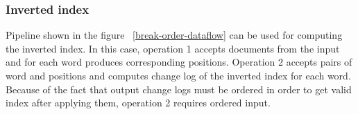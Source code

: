 \subsubsection{Inverted index}

Pipeline shown in the figure ~\ref{break-order-dataflow} can be used for computing the inverted index. In this case, operation 1 accepts documents from the input and for each word produces corresponding positions. Operation 2 accepts pairs of word and positions and computes change log of the inverted index for each word. Because of the fact that output change logs must be ordered in order to get valid index after applying them, operation 2 requires ordered input. 



